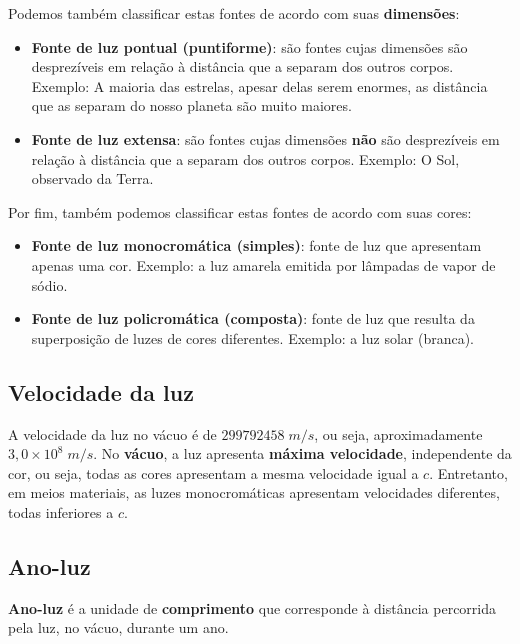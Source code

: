\documentclass[11pt,twocolumn,oneside]{article}
\begin{document}
Podemos também classificar estas fontes de acordo com suas \textbf{dimensões}:


\begin{itemize}

\item \textbf{Fonte de luz pontual (puntiforme)}: são fontes cujas dimensões são desprezíveis em relação à distância que a separam dos outros corpos. Exemplo: A maioria das estrelas, apesar delas serem enormes, as distância que as separam do nosso planeta são muito maiores.

\item \textbf{Fonte de luz extensa}: são fontes cujas dimensões \textbf{não} são desprezíveis em relação à distância que a separam dos outros corpos. Exemplo: O Sol, observado da Terra.

\end{itemize}


Por fim, também podemos classificar estas fontes de acordo com suas cores:


\begin{itemize}

\item \textbf{Fonte de luz monocromática (simples)}: fonte de luz que apresentam apenas uma cor. Exemplo: a luz amarela emitida por lâmpadas de vapor de sódio.

\item \textbf{Fonte de luz policromática (composta)}: fonte de luz que resulta da superposição de luzes de cores diferentes. Exemplo: a luz solar (branca).

\end{itemize}


\hypertarget{x-velocidade-da-luz}{\subsection{Velocidade da luz}}
A velocidade da luz no vácuo é de $299792458\;m/s$, ou seja, aproximadamente $3,0\times 10^{8}\;m/s$. No \textbf{vácuo}, a luz apresenta \textbf{máxima velocidade}, independente da cor, ou seja, todas as cores apresentam a mesma velocidade igual a $c$. Entretanto, em meios materiais, as luzes monocromáticas apresentam velocidades diferentes, todas inferiores a $c$.


\hypertarget{x-ano-luz}{\subsection{Ano-luz}}
\textbf{Ano-luz} é a unidade de \textbf{comprimento} que corresponde à distância percorrida pela luz, no vácuo, durante um ano.
\end{document}
